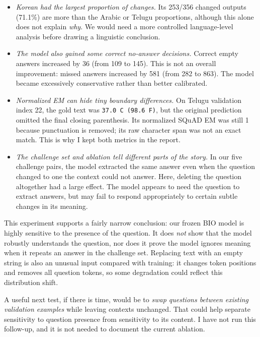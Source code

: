 \documentclass[10pt,a4paper]{article}
\newcommand{\sectionline}[1]{\vspace{2pt}{\large\bfseries #1}\par\vspace{0pt}}
\begin{document}
\sectionline{5. Interesting details and outliers}
\begin{itemize}
\item \emph{Korean had the largest proportion of changes.} Its 253/356 changed outputs (71.1\%) are more than the Arabic or Telugu proportions, although this alone does not explain \emph{why}. We would need a more controlled language-level analysis before drawing a linguistic conclusion.
\item \emph{The model also gained some correct no-answer decisions.} Correct empty answers increased by 36 (from 109 to 145). This is not an overall improvement: missed answers increased by 581 (from 282 to 863). The model became excessively conservative rather than better calibrated.
\item \emph{Normalized EM can hide tiny boundary differences.} On Telugu validation index 22, the gold text was \texttt{37.0 \textdegree C (98.6 \textdegree F)}, but the original prediction omitted the final closing parenthesis. Its normalized SQuAD EM was still 1 because punctuation is removed; its raw character span was not an exact match. This is why I kept both metrics in the report.
\item \emph{The challenge set and ablation tell different parts of the story.} In our five challenge pairs, the model extracted the same answer even when the question changed to one the context could not answer. Here, deleting the question altogether had a large effect. The model appears to need the question to extract answers, but may fail to respond appropriately to certain subtle changes in its meaning.
\end{itemize}

\sectionline{6.My Analysis}
This experiment supports a fairly narrow conclusion: our frozen BIO model is highly sensitive to the presence of the question. It does \emph{not} show that the model robustly understands the question, nor does it prove the model ignores meaning when it repeats an answer in the challenge set. Replacing text with an empty string is also an unusual input compared with training: it changes token positions and removes all question tokens, so some degradation could reflect this distribution shift.

A useful next test, if there is time, would be to \emph{swap questions between existing validation examples} while leaving contexts unchanged. That could help separate sensitivity to question presence from sensitivity to its content. I have not run this follow-up, and it is not needed to document the current ablation.
\end{document}
